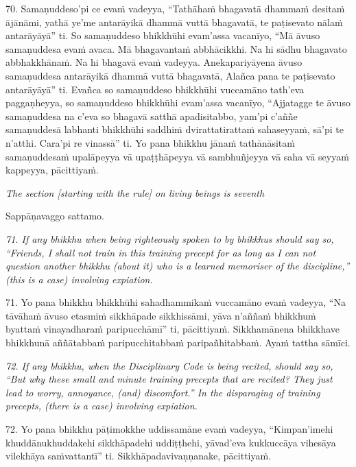 \documentclass[11pt]{article}
\begin{document}
\begin{paracol}{2}
\begin{column}
\begin{flushleft}
70. Samaṇuddeso’pi ce evaṁ vadeyya, “Tathāhaṁ bhagavatā dhammaṁ desitaṁ ājānāmi, yathā ye’me antarāyikā dhammā vuttā bhagavatā, te paṭisevato nālaṁ antarāyāyā” ti. So samaṇuddeso bhikkhūhi evam’assa vacanīyo, “Mā āvuso samaṇuddesa evaṁ avaca. Mā bhagavantaṁ abbhācikkhi. Na hi sādhu bhagavato abbhakkhānaṁ. Na hi bhagavā evaṁ vadeyya. Anekapariyāyena āvuso samaṇuddesa antarāyikā dhammā vuttā bhagavatā, Alañca pana te paṭisevato antarāyāyā” ti. Evañca so samaṇuddeso bhikkhūhi vuccamāno tath’eva paggaṇheyya, so samaṇuddeso bhikkhūhi evam’assa vacanīyo, “Ajjatagge te āvuso samaṇuddesa na c’eva so bhagavā satthā apadisitabbo, yam’pi c’aññe samaṇuddesā labhanti bhikkhūhi saddhiṁ dvirattatirattaṁ sahaseyyaṁ, sā’pi te n’atthi. Cara’pi re vinassā” ti. Yo pana bhikkhu jānaṁ tathānāsitaṁ samaṇuddesaṁ upalāpeyya vā upaṭṭhāpeyya vā sambhuñjeyya vā saha vā seyyaṁ kappeyya, pācittiyaṁ.
\switchcolumn*
\end{flushleft}

{\itshape\footnotesize
The section [starting with the rule] on living beings is seventh
}
\switchcolumn

\begin{flushleft}
Sappāṇavaggo sattamo.
\switchcolumn*
\end{flushleft}

{\itshape\footnotesize
71. If any bhikkhu when being righteously spoken to by bhikkhus should say so, “Friends, I shall not train in this training precept for as long as I can not question another bhikkhu (about it) who is a learned memoriser of the discipline,” (this is a case) involving expiation.
}
\switchcolumn

\begin{flushleft}
71. Yo pana bhikkhu bhikkhūhi sahadhammikaṁ vuccamāno evaṁ vadeyya, “Na tāvāhaṁ āvuso etasmiṁ sikkhāpade sikkhissāmi, yāva n’aññaṁ bhikkhuṁ byattaṁ vinayadharaṁ paripucchāmī” ti, pācittiyaṁ. Sikkhamānena bhikkhave bhikkhunā aññātabbaṁ paripucchitabbaṁ paripañhitabbaṁ. Ayaṁ tattha sāmīci.
\switchcolumn*
\end{flushleft}

{\itshape\footnotesize
72. If any bhikkhu, when the Disciplinary Code is being recited, should say so, “But why these small and minute training precepts that are recited? They just lead to worry, annoyance, (and) discomfort.” In the disparaging of training precepts, (there is a case) involving expiation.
}
\switchcolumn

\begin{flushleft}
72. Yo pana bhikkhu pāṭimokkhe uddissamāne evaṁ vadeyya, “Kimpan’imehi khuddānukhuddakehi sikkhāpadehi uddiṭṭhehi, yāvad’eva kukkuccāya vihesāya vilekhāya saṁvattantī” ti. Sikkhāpadavivaṇṇanake, pācittiyaṁ.
\switchcolumn*
\end{flushleft}


\end{column}
\end{paracol}
\end{document}
